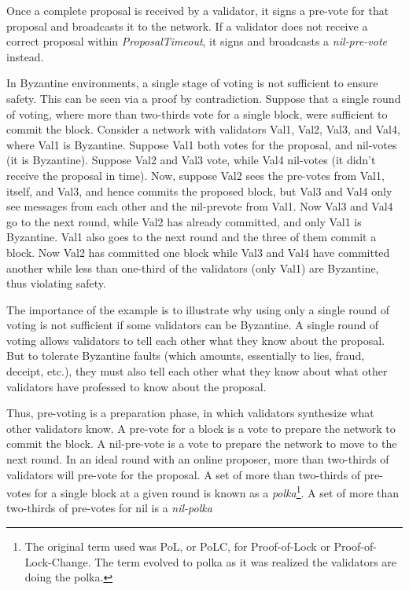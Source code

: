 Once a complete proposal is received by a validator, 
it signs a pre-vote for that proposal and broadcasts it to the network.
If a validator does not receive a correct proposal within \emph{ProposalTimeout}, 
it signs and broadcasts a \emph{nil-pre-vote} instead.

In Byzantine environments, a single stage of voting is not sufficient to ensure safety.
This can be seen via a proof by contradiction.
Suppose that a single round of voting, where more than two-thirds vote for a single block, were sufficient to commit the block.
Consider a network with validators Val1, Val2, Val3, and Val4, where Val1 is Byzantine.
Suppose Val1 both votes for the proposal, and nil-votes (it is Byzantine).
Suppose Val2 and Val3 vote, while Val4 nil-votes (it didn't receive the proposal in time).
Now, suppose Val2 sees the pre-votes from Val1, itself, and Val3, and hence commits the proposed block,
but Val3 and Val4 only see messages from each other and the nil-prevote from Val1.
Now Val3 and Val4 go to the next round, while Val2 has already committed, and only Val1 is Byzantine.
Val1 also goes to the next round and the three of them commit a block.
Now Val2 has committed one block while Val3 and Val4 have committed another while less than one-third of the validators (only Val1) are Byzantine,
thus violating safety. 

The importance of the example is to illustrate why using only a single round of voting
is not sufficient if some validators can be Byzantine.
A single round of voting allows validators to tell each other what they know about the proposal.	
But to tolerate Byzantine faults (which amounts, essentially to lies, fraud, deceipt, etc.), 
they must also tell each other what they know about what other validators have professed to know about the proposal.

Thus, pre-voting is a preparation phase, in which validators synthesize what other validators know.
A pre-vote for a block is a vote to prepare the network to commit the block.
A nil-pre-vote is a vote to prepare the network to move to the next round.
In an ideal round with an online proposer, more than two-thirds of validators will pre-vote for the proposal.
A set of more than two-thirds of pre-votes for a single block at a given round is known as a \emph{polka}\footnote{The original term used was PoL, or PoLC, for Proof-of-Lock or Proof-of-Lock-Change. The term evolved to polka as it was realized the validators are doing the polka.}.
A set of more than two-thirds of pre-votes for nil is a \emph{nil-polka}

